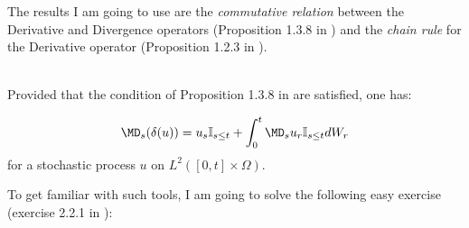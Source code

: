 The results I am going to use are the \textit{commutative relation} between the Derivative and Divergence operators (Proposition 1.3.8 in \cite{nualart}) and the \textit{chain rule} for the Derivative operator (Proposition 1.2.3 in \cite{nualart}).

\begin{prop}\ \\
Provided that the condition of Proposition 1.3.8 in \cite{nualart} are satisfied, one has:

\begin{equation}\label{eq: commumativeRelation}
\MD_s( \delta(u) )= u_s\mathbb{I}_{s\leq t} + \int_0^t\MD_s u_r \mathbb{I}_{s\leq t}dW_r
\end{equation}
for a stochastic process $u$ on $L^2([0,t] \times \Omega)$.
\end{prop}

To get familiar with such tools, I am going to solve the following easy exercise (exercise 2.2.1 in\cite{nualart} ):\\

